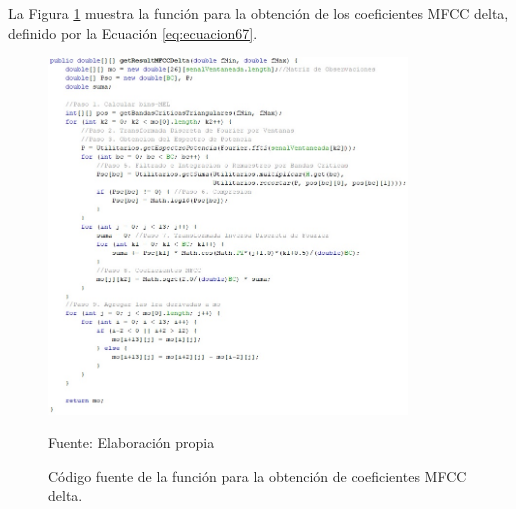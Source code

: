 \begin{enumerate}
La Figura \ref{fig:figura3.27} muestra la función para la obtención de los coeficientes MFCC delta, definido por la Ecuación \eqref{eq:ecuacion67}.
\begin{figure}[H]
\captionsetup{justification=centering}
\begin{center}
\includegraphics[width=0.85\textwidth]{Imagenes/Cap3/image027}
\end{center}
\begin{center}
\vskip -0.5cm
\caption{\small{Código fuente de la función para la obtención de coeficientes MFCC delta.}}
\label{fig:figura3.27}
{\small{Fuente: Elaboración propia}}
\end{center}
\end{figure}


\end{enumerate}
